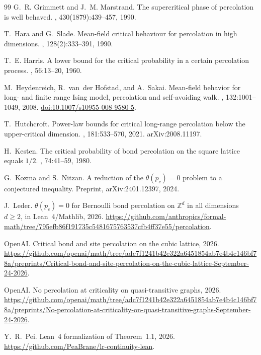 \documentclass[11pt]{article}
\theoremstyle{definition}
\theoremstyle{remark}
\numberwithin{equation}{section}
\newcommand{\1}{\mathbf 1}
\begin{document}
{\begin{thebibliography}{99}
G.~R. Grimmett and J.~M. Marstrand.
\newblock The supercritical phase of percolation is well behaved.
, 430(1879):439--457, 1990.

T.~Hara and G.~Slade.
\newblock Mean-field critical behaviour for percolation in high dimensions.
, 128(2):333--391, 1990.

T.~E. Harris.
\newblock A lower bound for the critical probability in a certain percolation process.
, 56:13--20, 1960.

M.~Heydenreich, R.~van~der Hofstad, and A.~Sakai.
\newblock Mean-field behavior for long- and finite range {I}sing model, percolation and self-avoiding walk.
, 132:1001--1049, 2008.
\newblock \href{https://doi.org/10.1007/s10955-008-9580-5}{doi:10.1007/s10955-008-9580-5}.

T.~Hutchcroft.
\newblock Power-law bounds for critical long-range percolation below the upper-critical dimension.
, 181:533--570, 2021.
\newblock arXiv:2008.11197.

H.~Kesten.
\newblock The critical probability of bond percolation on the square lattice equals $1/2$.
, 74:41--59, 1980.

G.~Kozma and S.~Nitzan.
\newblock A reduction of the $\theta(p_c)=0$ problem to a conjectured inequality.
\newblock Preprint, arXiv:2401.12397, 2024.

J.~Leder.
\newblock $\theta(p_c)=0$ for {B}ernoulli bond percolation on $\mathbb{Z}^d$ in all dimensions $d\ge2$, in {L}ean~4/{M}athlib, 2026.
\newblock \url{https://github.com/anthropics/formal-math/tree/795efb86f191735c5481675763537cfb4ff37e55/percolation}.

OpenAI.
\newblock Critical bond and site percolation on the cubic lattice, 2026.
\newblock \url{https://github.com/openai/math/tree/adc7f1241b42e322a6451854ab7e4b4c146bf78a/preprints/Critical-bond-and-site-percolation-on-the-cubic-lattice-September-24-2026}.

OpenAI.
\newblock No percolation at criticality on quasi-transitive graphs, 2026.
\newblock \url{https://github.com/openai/math/tree/adc7f1241b42e322a6451854ab7e4b4c146bf78a/preprints/No-percolation-at-criticality-on-quasi-transitive-graphs-September-24-2026}.

Y.~R.~Pei.
\newblock Lean~4 formalization of Theorem~1.1, 2026.
\newblock \url{https://github.com/PeaBrane/lr-continuity-lean}.

\end{thebibliography}
}
\end{document}
